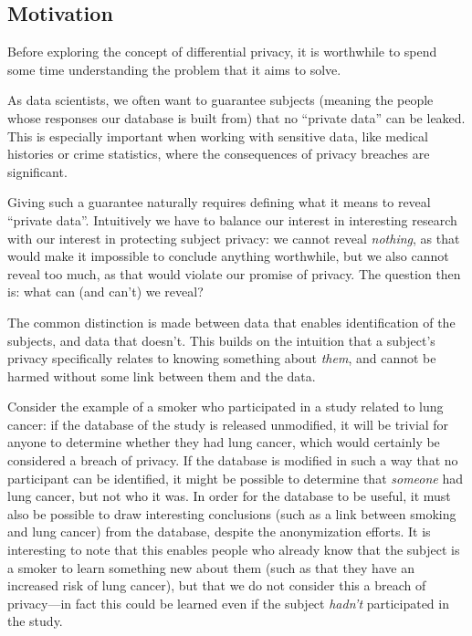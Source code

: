\documentclass[12pt]{article}
\begin{document}
\subsection{Motivation \label{sec:motivation}}

Before exploring the concept of differential privacy, it is worthwhile to spend some time understanding the problem that it aims to solve. \bigskip

As data scientists, we often want to guarantee subjects (meaning the people whose responses our database is built from) that no ``private data'' can be leaked. This is especially important when working with sensitive data, like medical histories or crime statistics, where the consequences of privacy breaches are significant.

Giving such a guarantee naturally requires defining what it means to reveal ``private data''. Intuitively we have to balance our interest in interesting research with our interest in protecting subject privacy: we cannot reveal \emph{nothing}, as that would make it impossible to conclude anything worthwhile, but we also cannot reveal too much, as that would violate our promise of privacy. The question then is: what can (and can't) we reveal?

The common distinction is made between data that enables identification of the subjects, and data that doesn't. This builds on the intuition that a subject's privacy specifically relates to knowing something about \emph{them}, and cannot be harmed without some link between them and the data.

Consider the example of a smoker who participated in a study related to lung cancer: if the database of the study is released unmodified, it will be trivial for anyone to determine whether they had lung cancer, which would certainly be considered a breach of privacy. If the database is modified in such a way that no participant can be identified, it might be possible to determine that \emph{someone} had lung cancer, but not who it was. In order for the database to be useful, it must also be possible to draw interesting conclusions (such as a link between smoking and lung cancer) from the database, despite the anonymization efforts. It is interesting to note that this enables people who already know that the subject is a smoker to learn something new about them (such as that they have an increased risk of lung cancer), but that we do not consider this a breach of privacy---in fact this could be learned even if the subject \emph{hadn't} participated in the study. \bigskip
\end{document}

